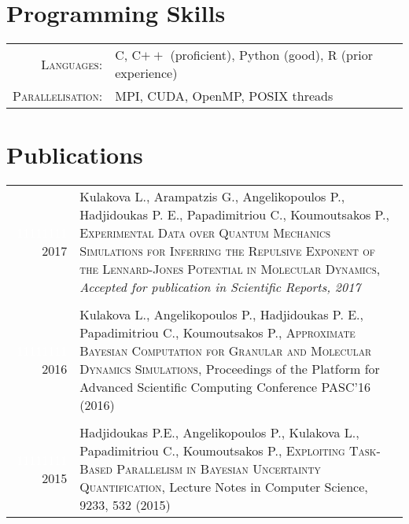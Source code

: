 \documentclass[a4paper,10pt]{article}
\begin{document}
\section{Programming Skills}
\begin{tabular}{rl}
    \textsc{Languages:} & C, C$++$ (proficient), Python (good), R (prior experience) \\
    \textsc{Parallelisation:} & MPI, CUDA, OpenMP, POSIX threads \\
\end{tabular}

\section{Publications}
\begin{tabular}{r|p{13cm}}
    \textcolor{white}{11111111} 2017 & Kulakova L., Arampatzis G.,
    Angelikopoulos P., Hadjidoukas P. E., Papadimitriou C., Koumoutsakos P.,
    \textsc{Experimental Data over Quantum Mechanics Simulations for Inferring
    the Repulsive Exponent of the Lennard-Jones Potential in Molecular
    Dynamics}, \textit{Accepted for publication in Scientific Reports, 2017} \\

    \multicolumn{2}{c}{} \\

    \textcolor{white}{11111111} 2016 & Kulakova L., Angelikopoulos P.,
    Hadjidoukas P. E., Papadimitriou C., Koumoutsakos P., \textsc{Approximate
    Bayesian Computation for Granular and Molecular Dynamics Simulations},
    Proceedings of the Platform for Advanced Scientific Computing Conference
    PASC'16 (2016) \\

    \multicolumn{2}{c}{} \\

    \textcolor{white}{11111111} 2015 & Hadjidoukas P.E., Angelikopoulos P.,
    Kulakova L., Papadimitriou C., Koumoutsakos P., \textsc{Exploiting
    Task-Based Parallelism in Bayesian Uncertainty Quantification}, Lecture
    Notes in Computer Science, 9233, 532 (2015)
\end{tabular}
\end{document}
